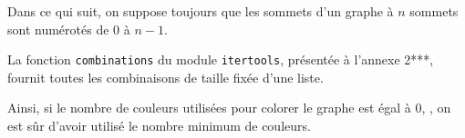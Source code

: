 Dans ce qui suit, on suppose toujours que les sommets d'un graphe à $n$ sommets sont numérotés de 0 à $n-1$.

\ifprof
\begin{corrige}

\end{corrige}
\else
\fi


La fonction \lstinline{combinations} du module \lstinline{itertools}, présentée à l'annexe 2***, fournit toutes les combinaisons de taille fixée d'une liste. 

\ifprof
\begin{corrige}

\end{corrige}
\else
\fi

Ainsi, si le nombre de couleurs utilisées pour colorer le graphe est égal à 0, , on est sûr d'avoir utilisé le nombre minimum de couleurs.